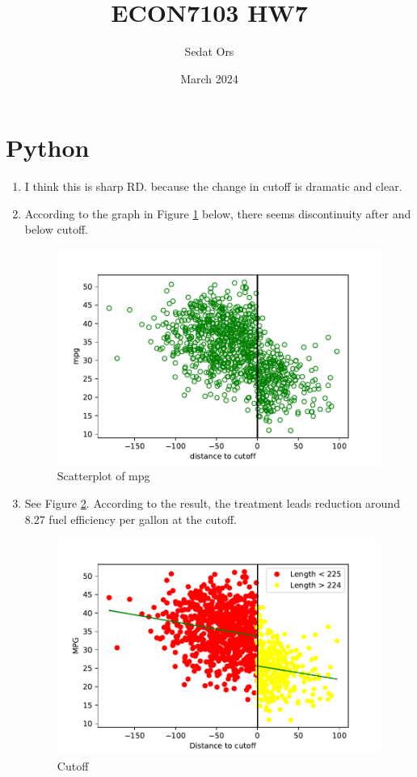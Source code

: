 \documentclass{article}
\title{ECON7103 HW7}
\author{Sedat Ors}
\date{March 2024}
\begin{document}
\maketitle
\section{Python}
\vspace{0.5cm}
\begin{enumerate}

\item I think this is sharp RD. because the change in cutoff is dramatic and clear.

\item According to the graph in Figure \ref{fig:Q2} below, there seems discontinuity after and below cutoff.
\begin{figure}[ht]
    \centering
     \includegraphics{HW6Q2.pdf}
    \caption{Scatterplot of mpg}
    \label{fig:Q2}
\end{figure}

\item 

See Figure \ref{tab:Q3}. 
According to the result, the treatment leads reduction around 8.27 fuel efficiency per gallon at the cutoff. 

\begin{figure}[ht]
    \centering
     \includegraphics{HW6Q3a.pdf}
    \caption{Cutoff }
    \label{tab:Q3}
\end{figure}



\end{enumerate}
\end{document}
